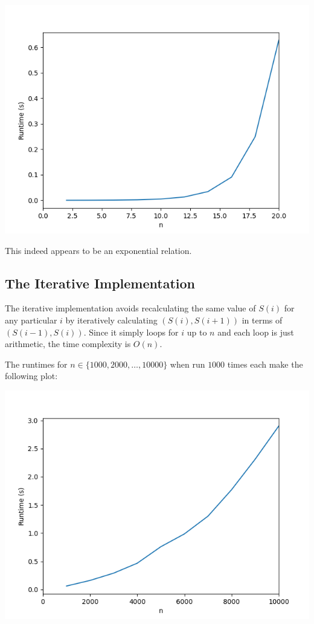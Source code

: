 \documentclass[12pt]{article}
\begin{document}
    \includegraphics[scale=0.65]{naive}

    This indeed appears to be an exponential relation.

    \subsection*{The Iterative Implementation}

    The iterative implementation avoids recalculating the same value of $S(i)$ for any particular $i$
    by iteratively calculating $(S(i), S(i + 1))$ in terms of $(S(i - 1), S(i))$.
    Since it simply loops for $i$ up to $n$ and each loop is just arithmetic,
    the time complexity is $O(n)$.

    The runtimes for $n \in \{1000, 2000, \dots, 10000\}$
    when run $1000$ times each make the following plot:

    \includegraphics[scale=0.65]{iterative}
\end{document}

